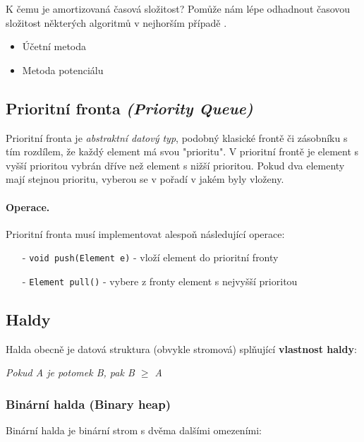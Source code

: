 K čemu je amortizovaná časová složitost? Pomůže nám lépe odhadnout časovou složitost některých algoritmů v nejhorším případě \cite{algoritmyeu:amortizovana}.

\begin{itemize}[itemsep=0pt, topsep=0pt]
    \item Účetní metoda
     \item Metoda potenciálu
\end{itemize}

\subsection*{Prioritní fronta \textit{(Priority Queue)}}
Prioritní fronta je \textit{abstraktní datový typ}, podobný klasické frontě či zásobníku s tím rozdílem, že každý element má svou "prioritu". V prioritní frontě je element s vyšší prioritou vybrán dříve než element s nižší prioritou. Pokud dva elementy mají stejnou prioritu, vyberou se v pořadí v jakém byly vloženy.

\paragraph{Operace.} Prioritní fronta musí implementovat alespoň následující operace:

\begin{itemize}[itemsep=0pt, topsep=2pt]
    \item[-] \texttt{void push(Element e)} - vloží element do prioritní fronty
    \item[-] \texttt{Element pull()} - vybere z fronty element s nejvyšší prioritou
\end{itemize}

\subsection*{Haldy}
Halda obecně je datová struktura (obvykle stromová) splňující \textbf{vlastnost haldy}:

\begin{center}
    \textit{Pokud A je potomek B, pak B $\geq$ A}
\end{center}

\subsubsection*{Binární halda (Binary heap)}
Binární halda je binární strom s dvěma dalšími omezeními:

